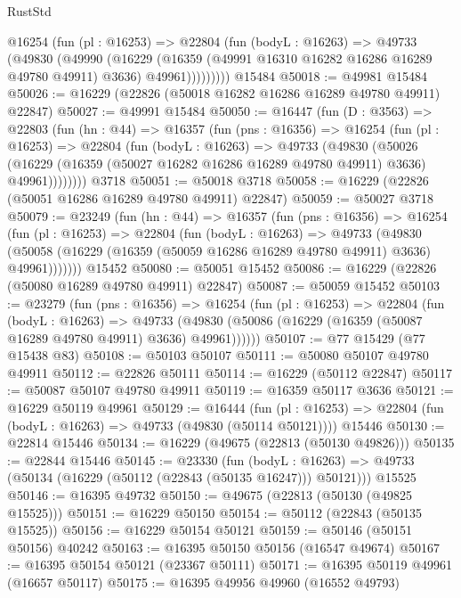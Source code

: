 \begin{lexlean}{RustStd}
\begin{coremodule}
          @16254
            (fun (pl : @16253) =>
            @22804
              (fun (bodyL : @16263) =>
              @49733
                (@49830
                  (@49990
                    (@16229
                      (@16359 (@49991 @16310 @16282 @16286 @16289 @49780 @49911) @3636)
                      @49961)))))))))
    @15484
@50018 := @49981 @15484
@50026 := @16229 (@22826 (@50018 @16282 @16286 @16289 @49780 @49911) @22847)
@50027 := @49991 @15484
@50050 := @16447
    (fun (D : @3563) =>
    @22803
      (fun (hn : @44) =>
      @16357
        (fun (pns : @16356) =>
        @16254
          (fun (pl : @16253) =>
          @22804
            (fun (bodyL : @16263) =>
            @49733
              (@49830
                (@50026
                  (@16229 (@16359 (@50027 @16282 @16286 @16289 @49780 @49911) @3636) @49961))))))))
    @3718
@50051 := @50018 @3718
@50058 := @16229 (@22826 (@50051 @16286 @16289 @49780 @49911) @22847)
@50059 := @50027 @3718
@50079 := @23249
    (fun (hn : @44) =>
    @16357
      (fun (pns : @16356) =>
      @16254
        (fun (pl : @16253) =>
        @22804
          (fun (bodyL : @16263) =>
          @49733
            (@49830
              (@50058 (@16229 (@16359 (@50059 @16286 @16289 @49780 @49911) @3636) @49961)))))))
    @15452
@50080 := @50051 @15452
@50086 := @16229 (@22826 (@50080 @16289 @49780 @49911) @22847)
@50087 := @50059 @15452
@50103 := @23279
    (fun (pns : @16356) =>
    @16254
      (fun (pl : @16253) =>
      @22804
        (fun (bodyL : @16263) =>
        @49733 (@49830 (@50086 (@16229 (@16359 (@50087 @16289 @49780 @49911) @3636) @49961))))))
@50107 := @77 @15429 (@77 @15438 @83)
@50108 := @50103 @50107
@50111 := @50080 @50107 @49780 @49911
@50112 := @22826 @50111
@50114 := @16229 (@50112 @22847)
@50117 := @50087 @50107 @49780 @49911
@50119 := @16359 @50117 @3636
@50121 := @16229 @50119 @49961
@50129 := @16444
    (fun (pl : @16253) => @22804 (fun (bodyL : @16263) => @49733 (@49830 (@50114 @50121))))
    @15446
@50130 := @22814 @15446
@50134 := @16229 (@49675 (@22813 (@50130 @49826)))
@50135 := @22844 @15446
@50145 := @23330
    (fun (bodyL : @16263) => @49733 (@50134 (@16229 (@50112 (@22843 (@50135 @16247))) @50121)))
    @15525
@50146 := @16395 @49732
@50150 := @49675 (@22813 (@50130 (@49825 @15525)))
@50151 := @16229 @50150
@50154 := @50112 (@22843 (@50135 @15525))
@50156 := @16229 @50154 @50121
@50159 := @50146 (@50151 @50156) @40242
@50163 := @16395 @50150 @50156 (@16547 @49674)
@50167 := @16395 @50154 @50121 (@23367 @50111)
@50171 := @16395 @50119 @49961 (@16657 @50117)
@50175 := @16395 @49956 @49960 (@16552 @49793)

\end{coremodule}
\end{lexlean}
